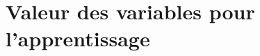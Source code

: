 \chapter{Valeur des variables pour l'apprentissage} %
\label{cha:Valeur des varibles pour l'apprentissage}

